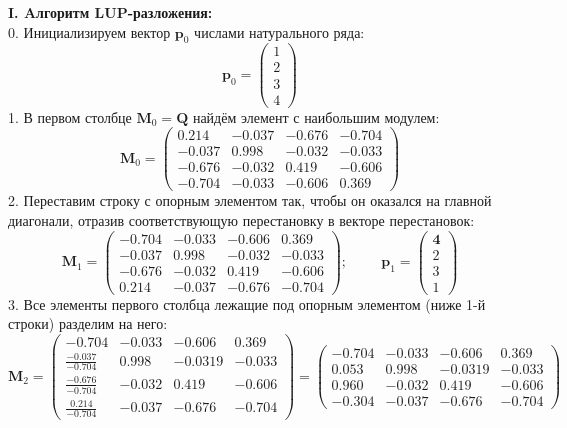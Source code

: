 {\large\bf{I. Aлгоритм LUP-разложения:}}\\
0. Инициализируем вектор $\mathbf{p}_0$ числами натурального ряда:
\vspace{-0.2cm}
\[
\mathbf{p}_0 =
\begin{pmatrix}
    1 \\
    2 \\
    3 \\
    4
\end{pmatrix}
\]
1. В первом столбце $\mathbf{M}_0 = \mathbf{Q}$ найдём элемент с наибольшим модулем:
\[
    \mathbf{M}_0 =
    \begin{pmatrix}
        0.214 & -0.037 &  -0.676 &  -0.704 \\
        -0.037 &   0.998 & -0.032 & -0.033 \\
        -0.676 & -0.032  &  0.419 &  -0.606 \\
        \mathbf{-0.704} & -0.033  & -0.606  &   0.369
    \end{pmatrix}
\]
2.  Переставим строку с опорным элементом так, чтобы он оказался на главной диагонали, отразив соответствующую перестановку в векторе перестановок:
\[
    \mathbf{M}_1 =
    \begin{pmatrix}
        \mathbf{-0.704} & \mathbf{-0.033}  & \mathbf{-0.606}  & \mathbf{0.369}\\
        -0.037 &   0.998 & -0.032 & -0.033 \\
        -0.676 & -0.032  &  0.419 &  -0.606 \\
        \mathit{0.214} & \mathit{-0.037} &  \mathit{-0.676} &  \mathit{-0.704}
    \end{pmatrix}; \hspace{1cm}
        \mathbf{p}_1 =
    \begin{pmatrix}
        \mathbf{4} \\
        2 \\
        3 \\
        \mathit{1}
    \end{pmatrix}
\]
3. Все элементы первого столбца лежащие под опорным элементом (ниже 1-й строки) разделим на него:
\[
\mathbf{M}_2 =
\begin{pmatrix}
    \mathbf{-0.704} & -0.033  & -0.606  & 0.369\\
    \mathit{\frac{-0.037}{-0.704}} &   0.998 & -0.0319 & -0.033 \\
    \mathit{\frac{-0.676}{-0.704}} & -0.032  &  0.419 &  -0.606 \\
    \mathit{\frac{0.214}{-0.704}} & -0.037 & -0.676 &  -0.704
\end{pmatrix} =
\begin{pmatrix}
    \mathbf{-0.704} & -0.033  & -0.606  & 0.369\\
    \mathit{0.053} &   0.998 & -0.0319 & -0.033 \\
    \mathit{0.960} & -0.032  &  0.419 &  -0.606 \\
    \mathit{-0.304} & -0.037 & -0.676 &  -0.704
\end{pmatrix}
\]
